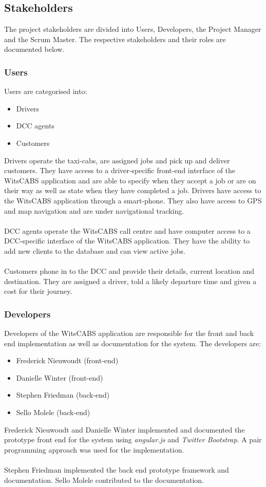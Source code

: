 \documentclass[12pt]{article}
\begin{document}
\subsection{Stakeholders}
The project stakeholders are divided into Users, Developers, the Project Manager and the Scrum Master. The respective stakeholders and their roles are documented below.
\subsubsection{Users}
Users are categorised into:
\begin{itemize}
\item Drivers
\item DCC agents
\item Customers
\end{itemize} 
Drivers operate the taxi-cabs, are assigned jobs and pick up and deliver customers. They have access to a driver-specific front-end interface of the WitsCABS application and are able to specify when they accept a job or are on their way as well as state when they have completed a job. Drivers have access to the WitsCABS application through a smart-phone. They also have access to GPS and map navigation and are under navigational tracking. \\\\

DCC agents operate the WitsCABS call centre and have computer access to a DCC-specific interface of the WitsCABS application. They have the ability to add new clients to the database and can view active jobs. \\\\

Customers phone in to the DCC and provide their details, current location and destination. They are assigned a driver, told a likely departure time and given a cost for their journey.

\subsubsection{Developers}
Developers of the WitsCABS application are responsible for the front and back end implementation as well as documentation for the system. The developers are:
\begin{itemize}
\item Frederick Nieuwoudt (front-end)
\item Danielle Winter (front-end)
\item Stephen Friedman (back-end)
\item Sello Molele (back-end)
\end{itemize} 
Frederick Nieuwoudt and Danielle Winter implemented and documented the prototype front end for the system using \textit{angular.js} and \textit{Twitter Bootstrap}. A pair programming approach was used for the implementation.\\\\
Stephen Friedman implemented the back end prototype framework and documentation. Sello Molele contributed to the documentation.
\end{document}
